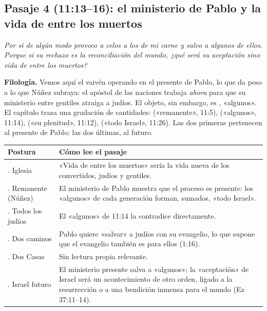 \subsection{Pasaje 4 (11:13--16): el ministerio de Pablo y la vida de entre los muertos}

\begin{cita}[fontupper=\upshape]
\par\smallskip
\itshape Por si de algún modo provoco a celos a los de mi carne y salvo a algunos de ellos. Porque si su rechazo es la reconciliación del mundo, ¿qué será su aceptación sino vida de entre los muertos?
\end{cita}

\textbf{Filología.} Vemos aquí el vaivén operando en el presente de Pablo, lo que da peso a lo que Núñez subraya: el apóstol de las naciones trabaja \emph{ahora} para que su ministerio entre gentiles atraiga a judíos. El objeto, sin embargo, es , «algunos». El capítulo traza una gradación de cantidades:  («remanente», 11:5),  («algunos», 11:14),  («su plenitud», 11:12),  («todo Israel», 11:26). Las dos primeras pertenecen al presente de Pablo; las dos últimas, al futuro.

\begin{center}\footnotesize
\renewcommand{\arraystretch}{1.25}
\begin{tabular}{>{\RaggedRight\arraybackslash}p{2.9cm}>{\RaggedRight\arraybackslash}p{11.1cm}}
\toprule
\textbf{Postura} & \textbf{Cómo lee el pasaje}\\
\midrule
1. Iglesia & «Vida de entre los muertos» sería la vida nueva de los convertidos, judíos y gentiles.\\
2. Remanente (Núñez) & El ministerio de Pablo muestra que el proceso es presente: los «algunos» de cada generación forman, sumados, «todo Israel».\\
3. Todos los judíos & El «algunos» de 11:14 la contradice directamente.\\
4. Dos caminos & Pablo quiere «salvar» a judíos con su evangelio, lo que supone que el evangelio también es para ellos (1:16).\\
5. Dos Casas & Sin lectura propia relevante.\\
6. Israel futuro & El ministerio presente salva a «algunos»; la «aceptación» de Israel será un acontecimiento de otro orden, ligado a la resurrección o a una bendición inmensa para el mundo (Ez 37:11--14).\\
\bottomrule
\end{tabular}\end{center}

